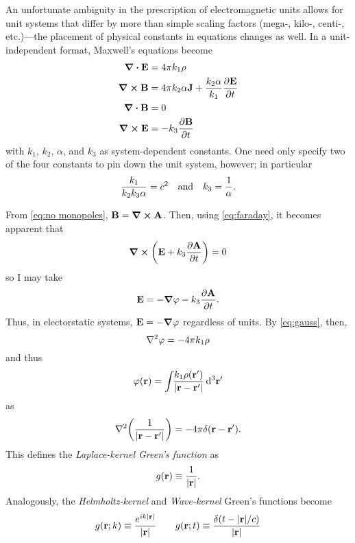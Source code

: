 An unfortunate ambiguity in the prescription of electromagnetic units allows for unit systems that differ by more than simple scaling factors (mega-, kilo-, centi-, etc.)---the placement of physical constants in equations changes as well.
In a unit-independent format, Maxwell's equations become~\cite{jackson2007classical}
\begin{subequations}
  \begin{align}
    \div{\vb{E}} &= 4 \pi k_1 \rho \label{eq:gauss} \\
    \curl{\vb{B}} &= 4 \pi k_2 \alpha \vb{J} + \frac{k_2 \alpha}{k_1} \pdv{\vb{E}}{t} \label{eq:ampere}\\
    \div{\vb{B}} &= 0 \label{eq:no monopoles} \\
    \curl{\vb{E}} &= - k_3 \pdv{\vb{B}}{t} \label{eq:faraday}
  \end{align}
  \label{eq:time-domain maxwell equations}
\end{subequations}
with $k_1$, $k_2$, $\alpha$, and $k_3$ as system-dependent constants.
One need only specify two of the four constants to pin down the unit system, however; in particular
\begin{equation}
  \frac{k_1}{k_2 k_3 \alpha} = c^2 \qq{and} k_3 = \frac{1}{\alpha}.
\end{equation}

From \cref{eq:no monopoles}, $\vb{B} = \curl{\vb{A}}$.
Then, using \cref{eq:faraday}, it becomes apparent that
\begin{equation*}
  \curl{\qty(\vb{E} + k_3 \pdv{\vb{A}}{t})} = 0
\end{equation*}
so I may take
\begin{equation*}
  \vb{E} = -\grad{\varphi} - k_3 \pdv{\vb{A}}{t}.
\end{equation*}
Thus, in electorstatic systems, $\vb{E} = -\grad{\varphi}$ regardless of units.
By \cref{eq:gauss}, then,
\begin{equation*}
  \laplacian \varphi = -4 \pi k_1 \rho
\end{equation*}
and thus
\begin{equation*}
  \varphi(\vb{r}) = \int_{} \kern0.1em \frac{k_1 \rho(\vb{r}')}{\abs{\vb{r} - \vb{r}'}} \dd[3]{\vb{r}'}
\end{equation*}
as
\begin{equation*}
  \laplacian \qty(\frac{1}{\abs{\vb{r} - \vb{r}'}}) = -4 \pi \delta(\vb{r} - \vb{r}').
\end{equation*}
This defines the \emph{Laplace-kernel Green's function} as
\begin{equation}
  g(\vb{r}) \equiv \frac{1}{\abs{\vb{r}}}.
  \label{eq:scalar green}
\end{equation}
Analogously, the \emph{Helmholtz-kernel} and \emph{Wave-kernel} Green's functions become
\begin{equation}
  g(\vb{r}; k) \equiv \frac{e^{i k \abs{\vb{r}}}}{\abs{\vb{r}}} \qquad
  g(\vb{r}; t) \equiv \frac{\delta(t - \abs{\vb{r}}/c)}{\abs{\vb{r}}}
\end{equation}

